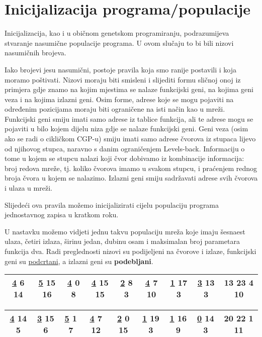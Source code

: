 \section{Inicijalizacija programa/populacije}
 \quad Inicijalizacija, kao i u običnom genetskom programiranju, podrazumijeva stvaranje nasumične populacije programa. U ovom slučaju to bi bili nizovi nasumičnih brojeva. \par 
 Iako brojevi jesu nasumični, postoje pravila koja smo ranije postavili i koja moramo poštivati. Nizovi moraju biti smisleni i slijediti formu sličnoj onoj iz primjera gdje znamo na kojim mjestima se nalaze funkcijski geni, na kojima geni veza i na kojima izlazni geni. Osim forme, adrese koje se mogu pojaviti na određenim pozicijama moraju biti ograničene na isti način kao u mreži. Funkcijski geni smiju imati samo adrese iz tablice funkcija, ali te adrese mogu se pojaviti u bilo kojem dijelu niza gdje se nalaze funkcijski geni. Geni veza (osim ako se radi o cikličkom CGP-u) smiju imati samo adrese čvorova iz stupaca lijevo od njihovog stupca, naravno s danim ograničenjem Levels-back. Informaciju o tome u kojem se stupcu nalazi koji čvor dobivamo iz kombinacije informacija: broj redova mreže, tj. koliko čvorova imamo u svakom stupcu, i praćenjem rednog broja čvora u kojem se nalazimo. Izlazni geni smiju sadržavati adrese svih čvorova i ulaza u mreži.  \par 
 Slijedeći ova pravila možemo inicijalizirati cijelu populaciju programa jednostavnog zapisa u kratkom roku.\newpage \par U nastavku možemo vidjeti jednu takvu populaciju mreža koje imaju šesnaest ulaza, četiri izlaza, širinu jedan, dubinu osam i maksimalan broj parametara funkcija dva. Radi preglednosti nizovi su podijeljeni na čvorove i izlaze, funkcijski geni su \underline{podcrtani}, a izlazni geni su \textbf{podebljani}.\newline
 
\begin{table}[h!]
\centering
\begin{tabular}{ |c|c|c|c|c|c|c|c|c|  }
	\hline
	\underline{4} 6 14 & \underline{5} 15 16 & \underline{4} 0 8 & \underline{4} 15 15 & \underline{2} 8 3 & \underline{4} 7 10 & \underline{1} 17 3 & \underline{3} 13 3 & \textbf{13 23 4 10}\\
	\hline
\end{tabular}
\end{table}

\begin{table}[h!]
	\centering
	\begin{tabular}{ |c|c|c|c|c|c|c|c|c|  }
		\hline
	 \underline{4} 14 5 & \underline{3} 15 6 & \underline{5} 1 7 & \underline{4} 7 12 & \underline{2} 0 15 & \underline{1} 19 3 & \underline{1} 16 9 & \underline{0} 14 3 & \textbf{20 22 1 11} \\
		\hline
	\end{tabular}
\end{table}


